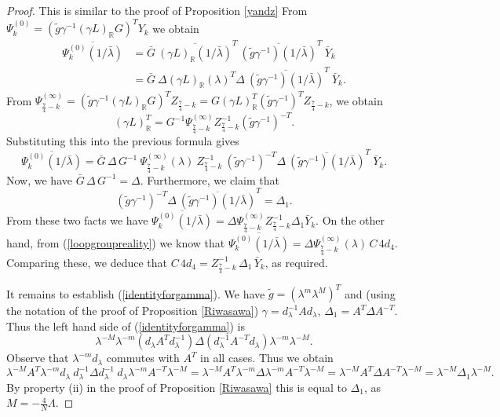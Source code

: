 \documentclass[a4paper,12pt,leqno]{amsart}
\numberwithin{equation}{section}
\theoremstyle{plain}
\theoremstyle{definition}
\newcommand{\R}{\mathbb R}
\newcommand{\ga}{\gamma}
\newcommand{\la}{\lambda}
\newcommand{\De}{\Delta}
\newcommand{\Psiz}{  \Psi^{(0)}  }
\newcommand{\Psii}{  \Psi^{(\infty)}  }
\newcommand{\nn}{m}
\newcommand{\NN}{M}
\newcommand{\MM}{\Lambda}
\newcommand{\gazi}{\gamma}
\begin{document}
{\begin{proof}
This is similar to the proof of Proposition \ref{yandz}
From $\Psiz_k=(\tilde g \gazi^{-1} (\gazi L)_\R G)^T Y_k$ we obtain
\begin{align*}
\overline{\Psiz_k(1/\bar\la)} 
&=
\bar G \ 
\overline{(\gazi L)_\R(1/\bar\la)}^T  \ \overline{(\tilde g\gazi^{-1})(1/\bar\la)}^T \ \bar Y_k
\\
&=
\bar G \   
\De 
(\gazi L)_\R(\la)^T \De
\ \overline{(\tilde g\gazi^{-1})(1/\bar\la)}^T \ \bar Y_k.
\end{align*}
From $\Psii_{\frac74-k}=(\tilde g \gazi^{-1} (\gazi L)_\R G)^T Z_{\frac74-k}
=G  (\gazi L)_\R^T (\tilde g \gazi^{-1})^T  Z_{\frac74-k}$,
we obtain 
\[
(\gazi L)_\R^T =  G^{-1} \Psii_{\frac74-k} Z_{\frac74-k}^{-1} (\tilde g \gazi^{-1})^{-T}.
\]
Substituting this into the previous formula gives
\[
\overline{\Psiz_k(1/\bar\la)}=
\bar G \,   \De\,   G^{-1} \ 
\Psii_{\frac74-k}(\la) \ Z_{\frac74-k}^{-1} \ 
(\tilde g \gazi^{-1})^{-T} \De \ 
\overline{(\tilde g\gazi^{-1})(1/\bar\la)}^T \ \bar Y_k.
\]
Now, we have
$\bar G \,  \De\,  G^{-1} = \De$.
Furthermore, we claim that 
\begin{equation}\label{identityforgamma}
(\tilde g \gazi^{-1})^{-T} \De \ 
\overline{(\tilde g\gazi^{-1})(1/\bar\la)}^T = \De_1.
\end{equation}
From these two facts we have
$\overline{\Psiz_k(1/\bar\la)} =\De \Psii_{\frac74-k} Z_{\frac74-k}^{-1} \De_1 
\bar Y_k$. On the other hand, from (\ref{loopgroupreality}) we know that 
$\overline{\Psiz_k(1/\bar\la)}=\De \Psii_{\frac74-k}(\la) \, C \, 4d_4$. 
Comparing these, we deduce that 
$C\,4d_4 =  Z_{\frac74-k}^{-1} \, \De_1 \, \bar Y_k$, as required.

It remains to establish (\ref{identityforgamma}).  We have $\tilde g=(\la^\nn\la^\NN)^T$ and (using the notation of the proof of Proposition \ref{Riwasawa}) $\ga=d_\la^{-1} A d_\la$,  $\De_1=A^T \De A^{-T}$.  Thus the left hand side of (\ref{identityforgamma}) is
\[
\la^{-\NN}\la^{-\nn}(d_\la A^T d_\la^{-1})
\De
(d_\la^{-1} A^{-T} d_\la) \la^{-\nn}\la^{-\NN}.
\]
Observe that $\la^{-\nn}d_\la$ commutes with $A^T$ in all cases.
Thus we obtain
$\la^{-\NN} A^T  \la^{-\nn}  d_\la \ d_\la^{-1}  
\De
d_\la^{-1} \ d_\la \la^{-\nn} A^{-T} \la^{-\NN}
=
\la^{-\NN} A^T  \la^{-\nn}   
\De
\la^{-\nn} A^{-T} \la^{-\NN} 
=
\la^{-\NN} A^T    
\De
A^{-T} \la^{-\NN} 
=
\la^{-\NN} \De_1 \la^{-\NN}.$
By property (ii) in the proof of Proposition \ref{Riwasawa}
this is equal to $\De_1$, as $M= -\frac4N\MM$.
\end{proof}

}
\end{document}
